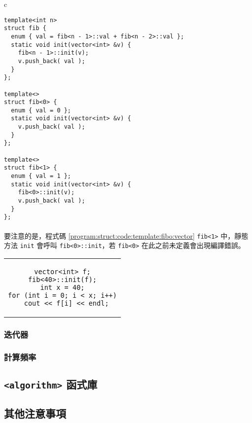 \documentclass[12pt,a4paper,oneside]{report}
\begin{document}
\begin{CJK}{UTF8}{bkai}
\begin{code}[h!]
\centering
\begin{tabular}{c}
\begin{lstlisting}
template<int n>
struct fib {
  enum { val = fib<n - 1>::val + fib<n - 2>::val };
  static void init(vector<int> &v) {
    fib<n - 1>::init(v);
    v.push_back( val );
  }
};

template<>
struct fib<0> {
  enum { val = 0 };
  static void init(vector<int> &v) {
    v.push_back( val );
  }
};

template<>
struct fib<1> {
  enum { val = 1 };
  static void init(vector<int> &v) {
    fib<0>::init(v);
    v.push_back( val );
  }
};
\end{lstlisting}
\end{tabular}
\caption{把費氏數列裝進 \lstinline!vector! 中}
\label{program:struct:code:template:fibo:vector}
\end{code}

\paragraph{}要注意的是，程式碼 \ref{program:struct:code:template:fibo:vector} \lstinline!fib<1>! 中，靜態方法 \lstinline!init! 會呼叫 \lstinline!fib<0>::init!，若 \lstinline!fib<0>! 在此之前未定義會出現編譯錯誤。

\begin{code}[h!]
\centering
\begin{tabular}{c}
\begin{lstlisting}
vector<int> f;
fib<40>::init(f);
int x = 40;
for (int i = 0; i < x; i++)
  cout << f[i] << endl;
\end{lstlisting}
\end{tabular}
\end{code}

\subsubsection{迭代器}

\subsubsection{計算頻率}

\subsection{\lstinline!<algorithm>! 函式庫}

\subsection{其他注意事項}


\end{CJK}
\end{document}
